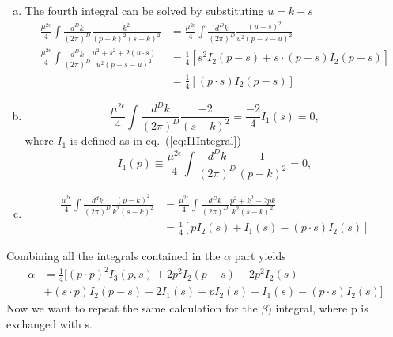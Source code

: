 \begin{enumerate}[i)]
\begin{enumerate}[a)]
				\item
					The fourth integral can be solved by substituting $u=k-s$
 				\begin{equation}
						\begin{split}
							\frac{\mu^{2\epsilon}}{4}\int\frac{d^Dk}{(2\pi)^D}\frac{k^2}{(p-k)^2(s-k)^2} &=	\frac{\mu^{2\epsilon}}{4}\int\frac{d^Dk}{(2\pi)^D} \frac{(u+s)^2}{u^2(p-s-u)^2} \\
							\frac{\mu^{2\epsilon}}{4}\int\frac{d^Dk}{(2\pi)^D} \frac{u^2 + s^2 + 2(u\cdot s)}{u^2(p-s-u)^2} &= \frac{1}{4}[s^2 I_2(p-s) + s\cdot(p-s) I_2(p-s)] \\
						&= \frac{1}{4}[(p\cdot s)I_2(p-s)]
						\end{split}
					\end{equation}	
				\item 
					\begin{equation}
						\frac{\mu^{2\epsilon}}{4}\int\frac{d^Dk}{(2\pi)^D}\frac{-2}{(s-k)^2} = \frac{-2}{4}I_1(s) = 0,  
					\end{equation}
					where $I_1$ is defined as in eq.~(\ref{eq:I1Integral})
					\begin{equation}
						I_1(p) \equiv \frac{\mu^{2\epsilon}}{4}\int\frac{d^Dk}{(2\pi)^D}\frac{1}{(p-k)^2} = 0,  
					\end{equation}
				\item
					\begin{equation}
						\begin{split}
					 		\frac{\mu^{2\epsilon}}{4}\int\frac{d^dk}{(2\pi)^D}\frac{(p-k)^2}{k^2(s-k)^2} &= \frac{\mu^{2\epsilon}}{4}\int\frac{d^Dk}{(2\pi)^D}\frac{p^2 + k^2 - 2pk}{k^2(s-k)^2} \\
							&= \frac{1}{4}[pI_2(s)+I_1(s)-(p\cdot s)I_2(s)]
						\end{split}
					\end{equation}
			\end{enumerate}
			Combining all the integrals contained in the $\alpha$ part yields
			\begin{equation}
				\begin{split}
					\alpha &= \frac{1}{4}[(p\cdot p)^2I_3(p,s)+2p^2I_2(p-s)-2p^2I_2(s) \\
					&+(s\cdot p)I_2(p-s)-2I_1(s)+pI_2(s)+I_1(s)-(p\cdot s)I_2(s)]
				\end{split}
			\end{equation}
			Now we want to repeat the same calculation for the $\beta)$ integral, where p is exchanged with s. \\\\

\end{enumerate}
